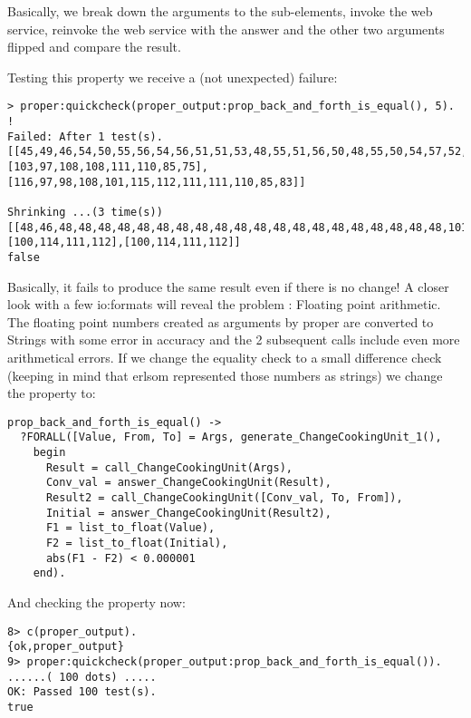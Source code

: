 \documentclass[submission,copyright]{eptcs}
\begin{document}
Basically, we break down the arguments to the sub-elements, invoke the web service, reinvoke the web service with the answer and the other two arguments flipped and compare the result. 

Testing this property we receive a (not unexpected) failure:

\begin{lstlisting}
> proper:quickcheck(proper_output:prop_back_and_forth_is_equal(), 5).
!
Failed: After 1 test(s).
[[45,49,46,54,50,55,56,54,56,51,51,53,48,55,51,56,50,48,55,50,54,57,52,101,45,48,49],[103,97,108,108,111,110,85,75],[116,97,98,108,101,115,112,111,111,110,85,83]]

Shrinking ...(3 time(s))
[[48,46,48,48,48,48,48,48,48,48,48,48,48,48,48,48,48,48,48,48,48,48,101,43,48,48],[100,114,111,112],[100,114,111,112]]
false
\end{lstlisting}

Basically, it fails to produce the same result even if there is no change! A closer look with a few io:formats will reveal the problem : Floating point arithmetic. The floating point numbers created as arguments by proper are converted to Strings with some error in accuracy and the 2 subsequent calls include even more arithmetical errors. If we change the equality check to a small difference check (keeping in mind that erlsom represented those numbers as strings) we change the property to:

\begin{lstlisting}
prop_back_and_forth_is_equal() ->
  ?FORALL([Value, From, To] = Args, generate_ChangeCookingUnit_1(),
    begin
      Result = call_ChangeCookingUnit(Args),
      Conv_val = answer_ChangeCookingUnit(Result),
      Result2 = call_ChangeCookingUnit([Conv_val, To, From]),
      Initial = answer_ChangeCookingUnit(Result2),
      F1 = list_to_float(Value),
      F2 = list_to_float(Initial),
      abs(F1 - F2) < 0.000001
    end).
\end{lstlisting}

And checking the property now:

\begin{lstlisting}
8> c(proper_output).                                                  
{ok,proper_output}
9> proper:quickcheck(proper_output:prop_back_and_forth_is_equal()).
......( 100 dots) .....
OK: Passed 100 test(s).
true
\end{lstlisting}
\end{document}
